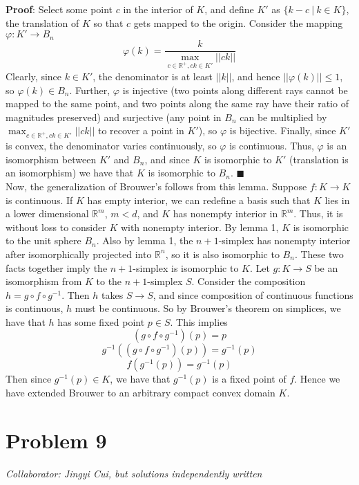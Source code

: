 \documentclass[10pt,letter]{article}
\begin{document}
\textbf{Proof}: Select some point $c$ in the interior of $K$, and define $K'$ as $\{ k - c \ | \ k \in  K \}$, the translation of $K$ so that $c$ gets mapped to the origin. Consider the mapping $\varphi: K' \to B_n$
\[ \varphi(k) = \frac{k}{\max_{c \in \mathbb{R}^+, ck \in K'} ||ck||} \] Clearly, since $k \in K'$, the denominator is at least $||k||$, and hence $||\varphi(k)|| \le 1$, so $ \varphi(k) \in B_n$. Further, $\varphi$ is injective (two points along different rays cannot be mapped to the same point, and two points along the same ray have their ratio of magnitudes preserved) and surjective (any point in $B_n$ can be multiplied by $\max_{c \in \mathbb{R}^+, ck \in K'} ||ck||$ to recover a point in $K'$), so $\varphi$ is bijective. Finally, since $K'$ is convex, the denominator varies continuously, so $\varphi$ is continuous. Thus, $\varphi$ is an isomorphism between $K'$ and $B_n$, and since $K$ is isomorphic to $K'$ (translation is an isomorphism) we have that $K$ is isomorphic to $B_n$. $\blacksquare$ \\

Now, the generalization of Brouwer's follows from this lemma. Suppose $f: K \to K$ is continuous. If $K$ has empty interior, we can redefine a basis such that $K$ lies in a lower dimensional $\mathbb{R}^m$, $m < d$, and $K$ has nonempty interior in $\mathbb{R}^m$. Thus, it is without loss to consider $K$ with nonempty interior. By lemma 1, $K$ is isomorphic to the unit sphere $B_n$. Also by lemma 1, the $n+1$-simplex has nonempty interior after isomorphically projected into $\mathbb{R}^n$, so it is also isomorphic to $B_n$. These two facts together imply the $n+1$-simplex is isomorphic to $K$. Let $g: K \to S$ be an isomorphism from $K$ to the $n+1$-simplex $S$. Consider the composition $h = g\circ f \circ g^{-1}$. Then $h$ takes $S \to S$, and since composition of continuous functions is continuous, $h$ must be continuous. So by Brouwer's theorem on simplices, we have that $h$ has some fixed point $p \in S$. This implies
\[ (g \circ f \circ g^{-1}) (p) = p \]
\[ g^{-1}((g \circ f \circ g^{-1}) (p)) = g^{-1}(p)\]
\[ f(g^{-1}(p)) = g^{-1}(p) \]
Then since $g^{-1}(p) \in K$, we have that $g^{-1}(p)$ is a fixed point of $f$. Hence we have extended Brouwer to an arbitrary compact convex domain $K$.
\section*{Problem 9}
\textit{Collaborator: Jingyi Cui, but solutions independently written}
\end{document}
